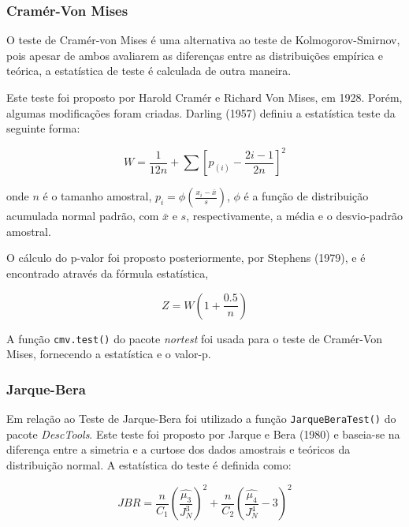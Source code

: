 \documentclass[a4paper,11pt]{article} %
\begin{document}
\subsubsection{Cramér-Von Mises}

O teste de Cramér-von Mises é uma alternativa ao teste de Kolmogorov-Smirnov, pois
apesar de ambos avaliarem as diferenças entre as distribuições empírica e teórica, a estatística de teste é calculada de outra maneira.\vskip0.3cm

Este teste foi proposto por Harold Cramér e Richard Von Mises, em 1928. Porém, algumas modificações foram criadas. Darling (1957) definiu a estatística teste da seguinte forma:

\begin{equation}
    W = \frac{1}{12n} + \sum \left[ p_{(i)} - \frac{2i-1}{2n} \right]^{2}
\end{equation}

onde $n$ é o tamanho amostral, $p_{i} = \phi \left(  \frac{x_{i}-\bar{x}}{s} \right)$, $\phi$ é a função de distribuição acumulada normal padrão, com $\bar{x}$ e $s$, respectivamente, a média e o desvio-padrão amostral.\vskip0.3cm

O cálculo do p-valor foi proposto posteriormente, por Stephens (1979), e é encontrado através da fórmula estatística,

\begin{equation}
    Z = W \left(1 + \frac{0.5}{n} \right)
\end{equation}

A função \texttt{cmv.test()} do pacote \textit{nortest} foi usada para o teste de Cramér-Von Mises, fornecendo a estatística e o valor-p.\vskip0.3cm

\subsubsection{Jarque-Bera}

Em relação ao Teste de Jarque-Bera foi utilizado a função  \texttt{JarqueBeraTest()} do pacote \textit{DescTools}. Este teste foi proposto por Jarque e Bera (1980) e baseia-se na diferença entre a simetria e a curtose dos dados amostrais e teóricos da distribuição normal. A estatística do teste é definida como: 

\begin{equation}
    JBR = \frac{n}{C_{1}} \left( \frac{\hat{\mu_{3}}}{J^{3}_{N}}  \right)^{2} + \frac{n}{C_{2}} \left( \frac{ \hat{\mu_{4}}}{J^{4}_{N}} - 3 \right)^{2} 
\end{equation}
\end{document}
